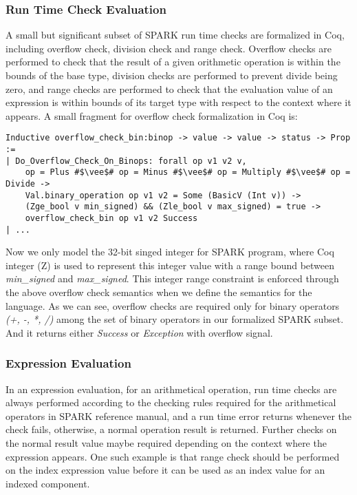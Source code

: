 \subsubsection{Run Time Check Evaluation}
A small but significant subset of SPARK run time checks are formalized in Coq,
including overflow check, division check and range check. Overflow checks are
performed to check that the result of a given orithmetic operation is within the
bounds of the base type, division checks are performed to prevent divide being
zero, and range checks are performed to check that the evaluation value of an
expression is within bounds of its target type with respect to the context where
it appears. A small fragment for overflow check formalization in Coq is:
\begin{lstlisting}[escapechar = \#, language=coq, basicstyle=\small]
Inductive overflow_check_bin:binop -> value -> value -> status -> Prop :=
| Do_Overflow_Check_On_Binops: forall op v1 v2 v, 
    op = Plus #$\vee$# op = Minus #$\vee$# op = Multiply #$\vee$# op = Divide ->
    Val.binary_operation op v1 v2 = Some (BasicV (Int v)) ->
    (Zge_bool v min_signed) && (Zle_bool v max_signed) = true ->  
    overflow_check_bin op v1 v2 Success
| ...
\end{lstlisting}
Now we only model the 32-bit singed integer for SPARK program, where Coq integer
(Z) is used to represent this integer value with a range bound between \textit{min\_signed}
and \textit{max\_signed}. This integer range constraint is enforced through
the above overflow check semantics when we define the semantics for the
language. As we can see, overflow checks are required only for binary operators
\textit{(+, -, *, /)} among the set of binary operators in our formalized SPARK
subset. And it returns either \textit{Success} or \textit{Exception} with
overflow signal.

\subsubsection{Expression Evaluation}
In an expression evaluation, for an arithmetical operation, run time checks are
always performed according to the checking rules required for the arithmetical
operators in SPARK reference manual, and a run time error returns whenever the
check fails, otherwise, a normal operation result is returned. Further checks on
the normal result value maybe required depending on the context where the
expression appears. One such example is that range check should be performed on
the index expression value before it can be used as an index value for an
indexed component.

